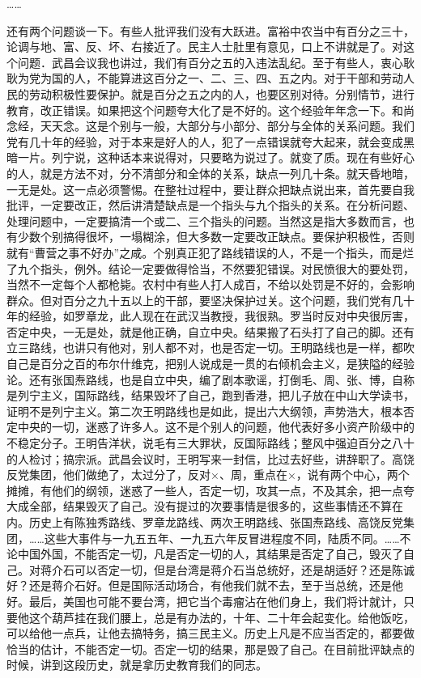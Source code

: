 ……

还有两个问题谈一下。有些人批评我们没有大跃进。富裕中农当中有百分之三十，论调与地、富、反、坏、右接近了。民主人士肚里有意见，口上不讲就是了。对这个问题．武昌会议我也讲过，我们有百分之五的入违法乱纪。至于有些人，衷心耿耿为党为国的人，不能算进这百分之一、二、三、四、五之内。对于干部和劳动人民的劳动积极性要保护。就是百分之五之内的人，也要区别对待。分别情节，进行教育，改正错误。如果把这个问题夸大化了是不好的。这个经验年年念一下。和尚念经，天天念。这是个别与一般，大部分与小部分、部分与全体的关系问题。我们党有几十年的经验，对于本来是好人的人，犯了一点错误就夸大起来，就会变成黑暗一片。列宁说，这种话本来说得对，只要略为说过了。就变了质。现在有些好心的人，就是方法不对，分不清部分和全体的关系，缺点一列几十条。就天昏地暗，一无是处。这一点必须警惕。在整社过程中，要让群众把缺点说出来，首先要自我批评，一定要改正，然后讲清楚缺点是一个指头与九个指头的关系。在分析问题、处理问题中，一定要搞清一个或二、三个指头的问题。当然这是指大多数而言，也有少数个别搞得很坏，一塌糊涂，但大多数一定要改正缺点。要保护积极性，否则就有“曹营之事不好办”之咸。个别真正犯了路线错误的人，不是一个指头，而是烂了九个指头，例外。结论一定要做得恰当，不然要犯错误。对民愤很大的要处罚，当然不一定每个人都枪毙。农村中有些人打人成百，不给以处罚是不好的，会影响群众。但对百分之九十五以上的干部，要坚决保护过关。这个问题，我们党有几十年的经验，如罗章龙，此人现在在武汉当教授，我很熟。罗当时反对中央很厉害，否定中央，一无是处，就是他正确，自立中央。结果搬了石头打了自己的脚。还有立三路线，也讲只有他对，别人都不对，也是否定一切。王明路线也是一样，都吹自己是百分之百的布尔什维克，把别人说成是一贯的右倾机会主义，是狭隘的经验论。还有张国焘路线，也是自立中央，编了剧本歌谣，打倒毛、周、张、博，自称是列宁主义，国际路线，结果毁坏了自己，跑到香港，把儿子放在中山大学读书，证明不是列宁主义。第二次王明路线也是如此，提出六大纲领，声势浩大，根本否定中央的一切，迷惑了许多人。这不是个别人的问题，他代表好多小资产阶级中的不稳定分子。王明告洋状，说毛有三大罪状，反国际路线；整风中强迫百分之八十的人检讨；搞宗派。武昌会议时，王明写来一封信，比过去好些，讲辞职了。高饶反党集团，他们做绝了，太过分了，反对×、周，重点在×，说有两个中心，两个摊摊，有他们的纲领，迷惑了一些人，否定一切，攻其一点，不及其余，把一点夸大成全部，结果毁灭了自己。没有提过的次要事情是很多的，这些事情还不算在内。历史上有陈独秀路线、罗章龙路线、两次王明路线、张国焘路线、高饶反党集团，……这些大事件与一九五五年、一九五六年反冒进程度不同，陆质不同。……不论中国外国，不能否定一切，凡是否定一切的人，其结果是否定了自己，毁灭了自己。对蒋介石可以否定一切，但是台湾是蒋介石当总统好，还是胡适好？还是陈诚好？还是蒋介石好。但是国际活动场合，有他我们就不去，至于当总统，还是他好。最后，美国也可能不要台湾，把它当个毒瘤沾在他们身上，我们将计就计，只要他这个葫芦挂在我们腰上，总是有办法的，十年、二十年会起变化。给他饭吃，可以给他一点兵，让他去搞特务，搞三民主义。历史上凡是不应当否定的，都要做恰当的估计，不能否定一切。否定一切的结果，那是毁了自己。在目前批评缺点的时候，讲到这段历史，就是拿历史教育我们的同志。

